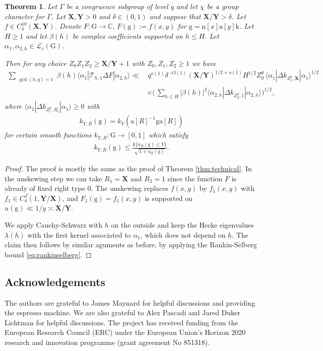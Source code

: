 \documentclass[12pt]{amsart}
\newtheorem{theorem}{Theorem}[section]
\theoremstyle{definition}
\theoremstyle{remark}
\numberwithin{equation}{section}
\newcommand{\G}{\mathrm{G}}
\newcommand{\C}{{\mathbb C}}
\newcommand{\1}{{\mathbf 1}}
\renewcommand{\a}{\mathrm{a}}
\newcommand{\n}{\mathrm{n}}
\renewcommand{\k}{\mathrm{k}}
\newcommand{\g}{\mathrm{g}}
\renewcommand{\n}{\mathrm{n}}
\begin{document}
\begin{theorem}\label{thm:kinvtechnical}
    Let $\Gamma$ be a congruence subgroup of level $q$ and let $\chi$ be a group character for $\Gamma$.   Let $\mathbf{X},\mathbf{Y} > 0$ and $\delta \in (0,1)$ and suppose that
  $\mathbf{X}/\mathbf{Y}  > \delta$.   Let $f \in C^{10}_\delta (\mathbf{X},\mathbf{Y})$. Denote $F:\G \to \C, \, F(\g):= f(x,y)$ for $\g = \n[x]\a[y]\k$.  
Let $H \geq 1$ and let $\beta(h)$ be complex coefficients supported on $h \leq H$. Let  $\alpha_1,\alpha_{2,h} \in \mathcal{L}_c(\G)$.

Then for any choice $Z_0Z_1Z_2\geq \mathbf{X}/\mathbf{Y}+1$ with $Z_0,Z_1,Z_2 \geq 1$ we have 
\begin{align*}
 \sum_{\substack{\gcd(h,q)=1}}\beta(h)  \langle \alpha_1 | \mathcal{T}_{h,1}  \Delta F | \alpha_{2,h} \rangle \ll & \, q^{o(1)} \delta^{-O(1)}  (\mathbf{X}/\mathbf{Y})^{1/2+o(1)} H^{1/2} Z_0^\theta  \, \langle  \alpha_1| \Delta  k_{Z_1^2,\mathbf{X}}| \alpha_1\rangle^{1/2} \\
& \times\bigg(  \, \sum_{h \leq H} |\beta(h)|^2\langle  \alpha_{2,h} |\Delta k_{Z_2^2,1} | \alpha_{2,h} \rangle \bigg)^{1/2},
\end{align*}
where $\langle \alpha_1| \Delta k_{Z_i^2,R_i}| \alpha_1\rangle \geq 0$ with 
\begin{align*}
    k_{Y,R}(\g)=k_Y(\a[R]^{-1}\g \a [R]) 
\end{align*}
for certain smooth functions $k_{Y,R} :\G \to [0,1]$ which satisfy
\begin{align*}
    k_{Y,R}(\g)  \leq  \frac{\mathbf{1}\{u_R(\g) \leq Y\}}{\sqrt{1+u_R(\g)}}.
\end{align*}
\end{theorem}

\begin{proof}
    The proof is mostly the same  as the proof of Theorem \ref{thm:technical}. In the unskewing step we can take $R_1=\mathbf{X}$ and $R_2=1$ since the function $F$ is already  of fixed right type $0$. The unskewing replaces $f(x,y)$ by $f_1(x,y)$ with $f_1 \in C^{J}_\delta(1,\mathbf{Y}/\mathbf{X})$, and $F_1(\g)=f_1(x,y)$ is supported on $u(\g) \ll 1/y \asymp \mathbf{X}/\mathbf{Y}$.
    
We apply Cauchy-Schwarz with $h$ on the outside and keep the Hecke eigenvalues $\lambda(h)$ with the first kernel associated to $\alpha_1$, which does not depend on $h$. The claim then follows by similar aguments as before, by applying the Rankin-Selberg bound \eqref{eq:rankinselberg}.
\end{proof}


\subsection*{Acknowledgements}
The authors are grateful to James Maynard for helpful discussions and providing the espresso machine. We are also grateful to Alex Pascadi and Jared Duker Lichtman for helpful discussions. The project has
received funding from the European Research Council (ERC) under the European Union's Horizon 2020 research and innovation programme (grant agreement No 851318).



\end{document}
